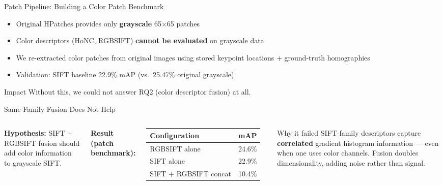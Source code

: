 \documentclass[aspectratio=169, 12pt]{beamer}
\begin{document}
\begin{frame}{Patch Pipeline: Building a Color Patch Benchmark}
  \begin{itemize}
    \item Original HPatches provides only \textbf{grayscale} 65$\times$65 patches~\cite{balntas2017hpatches}
    \item Color descriptors (HoNC, RGBSIFT) \textbf{cannot be evaluated} on grayscale data
    \item We re-extracted color patches from original images using stored keypoint locations + ground-truth homographies
    \item Validation: SIFT baseline 22.9\% mAP (vs.\ 25.47\% original grayscale)
  \end{itemize}
  \vfill
  \begin{alertblock}{Impact}
    Without this, we could not answer RQ2 (color descriptor fusion) at all.
  \end{alertblock}
\end{frame}

\begin{frame}{Same-Family Fusion Does Not Help}
  \begin{columns}[T]
    \textbf{Hypothesis:} SIFT + RGBSIFT fusion should add color information to grayscale SIFT.
    \vspace{0.5em}

    \textbf{Result (patch benchmark):}
    \begin{table}[h]
    \centering\small
    \begin{tabular}{lr}
      \toprule
      \textbf{Configuration} & \textbf{mAP} \\
      \midrule
      RGBSIFT alone & 24.6\% \\
      SIFT alone & 22.9\% \\
      SIFT + RGBSIFT concat & {\color{degrade}10.4\%} \\
      \bottomrule
    \end{tabular}
    \end{table}

    \begin{alertblock}{Why it failed}
      SIFT-family descriptors capture \textbf{correlated} gradient histogram information ---
      even when one uses color channels.
      Fusion doubles dimensionality, adding noise rather than signal.
    \end{alertblock}
  \end{columns}
\end{frame}
\end{document}

